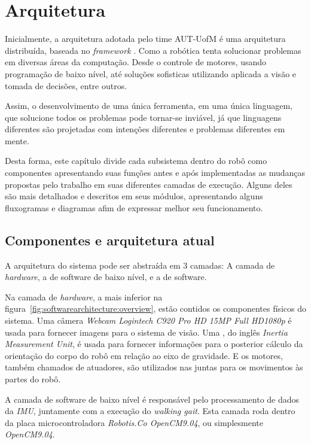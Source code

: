\chapter{Arquitetura}
\label{ch:architecture}

Inicialmente, a arquitetura adotada pelo time AUT-UofM é uma arquitetura distribuída, baseada no \textit{framework} . Como a robótica tenta solucionar problemas em diversas áreas da computação. Desde o controle de motores, usando programação de baixo nível, até soluções sofisticas utilizando  aplicada a visão e tomada de decisões, entre outros.

Assim, o desenvolvimento de uma única ferramenta, em uma única linguagem, que solucione todos os problemas pode tornar-se inviável, já que linguagens diferentes são projetadas com intenções diferentes e problemas diferentes em mente.

Desta forma, este capítulo divide cada subsistema dentro do robô como componentes apresentando suas funções antes e após implementadas as mudanças propostas pelo trabalho em suas diferentes camadas de execução. Alguns deles são mais detalhados e descritos em seus módulos, apresentando alguns fluxogramas e diagramas afim de expressar melhor seu funcionamento.

\section{Componentes e arquitetura atual}
\label{sec:architecture:current_components_and_architecture}

A arquitetura do sistema pode ser abstraída em $3$ camadas: A camada de \textit{hardware}, a de software de baixo nível, e a de software.

Na camada de \textit{hardware}, a mais inferior na figura~\ref{fig:softwarearchitecture:overview}, estão contidos os componentes físicos do sistema. Uma câmera \textit{Webcam Logintech C920 Pro HD 15MP Full HD1080p} é usada para fornecer imagens para o sistema de visão. Uma , do inglês \textit{Inertia Measurement Unit}, é usada para fornecer informações para o posterior cálculo da orientação do corpo do robô em relação ao eixo de gravidade. E os motores, também chamados de atuadores, são utilizados nas juntas para os movimentos às partes do robô.

A camada de software de baixo nível é responsável pelo processamento de dados da \textit{IMU}, juntamente com a execução do \textit{walking gait}. Esta camada roda dentro da placa microcontroladora \textit{Robotis.Co OpenCM9.04}, ou simplesmente \textit{OpenCM9.04}.

